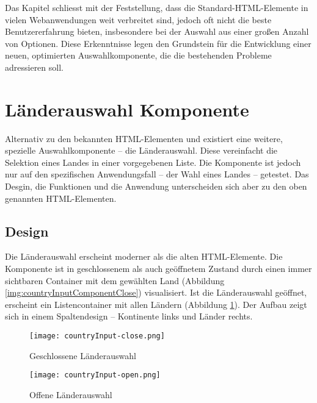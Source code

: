 Das Kapitel schliesst mit der Feststellung, dass die Standard-HTML-Elemente in vielen Webanwendungen weit verbreitet sind, jedoch oft nicht die beste Benutzererfahrung bieten, insbesondere bei der Auswahl aus einer großen Anzahl von Optionen. 
Diese Erkenntnisse legen den Grundstein für die Entwicklung einer neuen, optimierten Auswahlkomponente, die die bestehenden Probleme adressieren soll. 



\section{Länderauswahl Komponente}
\label{sec:countryChoice}

Alternativ zu den bekannten HTML-Elementen  und  existiert eine weitere, spezielle Auswahlkomponente – die Länderauswahl\citemarktext{
    [\cite{ip5}]
}. 
Diese vereinfacht die Selektion eines Landes in einer vorgegebenen Liste. 
Die Komponente ist jedoch nur auf den spezifischen Anwendungsfall – der Wahl eines Landes – getestet. 
Das Desgin, die Funktionen und die Anwendung unterscheiden sich aber zu den oben genannten HTML-Elementen. 

\subsection{Design}
\label{sec:countryChoiceDesign}

Die Länderauswahl erscheint moderner als die alten HTML-Elemente. 
Die Komponente ist in geschlossenem als auch geöffnetem Zustand durch einen immer sichtbaren Container mit dem gewählten Land (Abbildung \ref{img:countryInputComponentClose}) visualisiert. 
Ist die Länderauswahl geöffnet, erscheint ein Listencontainer mit allen Ländern (Abbildung \ref{img:countryInputComponentOpen}). 
Der Aufbau zeigt sich in einem Spaltendesign – Kontinente links und Länder rechts. 

\begin{figure}[!htb]
    \centering
    \begin{minipage}[b]{0.5\textwidth}
        \centering
        \texttt{[image: countryInput-close.png]}
        \caption{Geschlossene Länderauswahl}
        \label{img:countryInputComponentClose}
    \end{minipage}
    \hfill
    \begin{minipage}[b]{0.45\textwidth}
        \centering
        \texttt{[image: countryInput-open.png]}
        \caption{Offene Länderauswahl}
        \label{img:countryInputComponentOpen}
    \end{minipage}
\end{figure}

